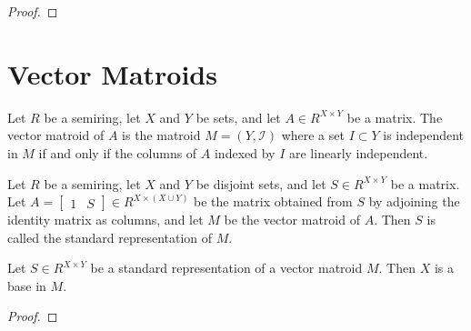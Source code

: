 \begin{proof}
    \leanok
    \SeeLean
\end{proof}


\section{Vector Matroids}

\begin{definition}
    \label{VectorMatroid}
    \leanok
    Let $R$ be a semiring, let $X$ and $Y$ be sets, and let $A \in R^{X \times Y}$ be a matrix. The vector matroid of $A$ is the matroid $M = (Y, \mathcal{I})$ where a set $I \subset Y$ is independent in $M$ if and only if the columns of $A$ indexed by $I$ are linearly independent.
\end{definition}

\begin{definition}
    \label{StandardRepr}
    \leanok
    Let $R$ be a semiring, let $X$ and $Y$ be disjoint sets, and let $S \in R^{X \times Y}$ be a matrix. Let $A = \begin{bmatrix} 1 & S \end{bmatrix} \in R^{X \times (X \cup Y)}$ be the matrix obtained from $S$ by adjoining the identity matrix as columns, and let $M$ be the vector matroid of $A$. Then $S$ is called the standard representation of $M$.
\end{definition}

\begin{lemma}
    \label{StandardRepr.toMatroid_isBase_X}
    \leanok
    Let $S \in R^{X \times Y}$ be a standard representation of a vector matroid $M$. Then $X$ is a base in $M$.
\end{lemma}

\begin{proof}
    \leanok
    \SeeLean
\end{proof}



